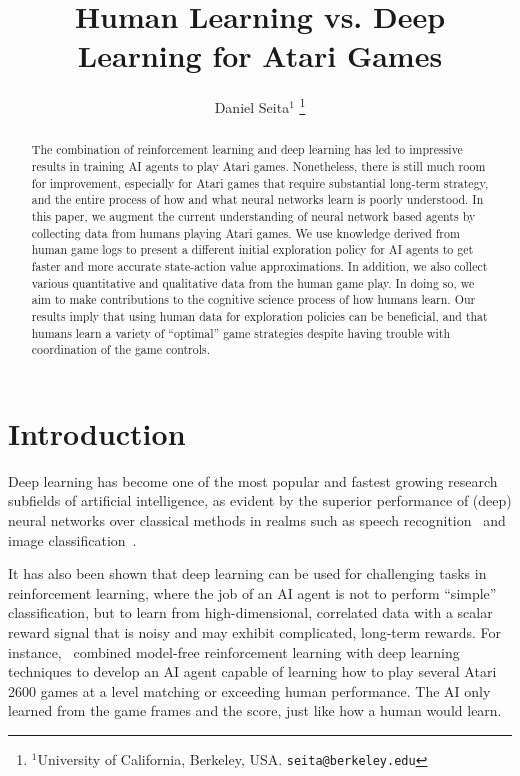 \documentclass[letterpaper, 10 pt, conference]{ieeeconf}  %
\title{\LARGE \bf
Human Learning vs. Deep Learning for Atari Games
}
\author{Daniel Seita$^{1}$%
\thanks{$^{1}$University of California, Berkeley, USA. {\tt\small seita@berkeley.edu}}%
}
\begin{document}
\maketitle
\thispagestyle{empty}
\pagestyle{empty}

\begin{abstract}

The combination of reinforcement learning and deep learning has led to impressive results in
training AI agents to play Atari games. Nonetheless, there is still much room for improvement,
especially for Atari games that require substantial long-term strategy, and the entire process of
how and what neural networks learn is poorly understood. In this paper, we augment the current
understanding of neural network based agents by collecting data from humans playing Atari games. We
use knowledge derived from human game logs to present a different initial exploration policy for AI
agents to get faster and more accurate state-action value approximations. In addition, we also
collect various quantitative and qualitative data from the human game play. In doing so, we aim to
make contributions to the cognitive science process of how humans learn. Our results imply that
using human data for exploration policies can be beneficial, and that humans learn a variety of
``optimal'' game strategies despite having trouble with coordination of the game controls.

\end{abstract}


\section{Introduction}\label{sec:intro}

Deep learning has become one of the most popular and fastest growing research subfields of
artificial intelligence, as evident by the superior performance of (deep) neural networks over
classical methods in realms such as speech recognition~\cite{speech} and image
classification~\cite{image_classification}.

It has also been shown that deep learning can be used for challenging tasks in reinforcement
learning, where the job of an AI agent is not to perform ``simple'' classification, but to learn
from high-dimensional, correlated data with a scalar reward signal that is noisy and may exhibit
complicated, long-term rewards. For instance,~\cite{mnih-atari-2013} combined model-free
reinforcement learning with deep learning techniques to develop an AI agent capable of learning how
to play several Atari 2600 games at a level matching or exceeding human performance. The AI only
learned from the game frames and the score, just like how a human would learn.
\end{document}
